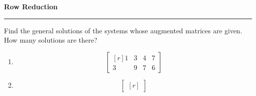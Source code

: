 \documentclass[12pt]{article}
\begin{document}
\begin{center}
{\bf \Large Row Reduction}
\vspace{0.2cm}
\hrule
\end{center}

\begin{multicols*}{2}
	\item Find the general solutions of the systems whose augmented matrices are given. How many solutions are there?
	\begin{enumerate}
		\item \[
		\begin{bmatrix*}[r]
			1 & 3 & 4 & 7\\
			3 & 9 & 7 & 6
		\end{bmatrix*}
		\]
		\vfill
		\item \[
		\begin{bmatrix*}[r]
			
		\end{bmatrix*}
		\]
	\end{enumerate}
\end{multicols*}
\end{document}
